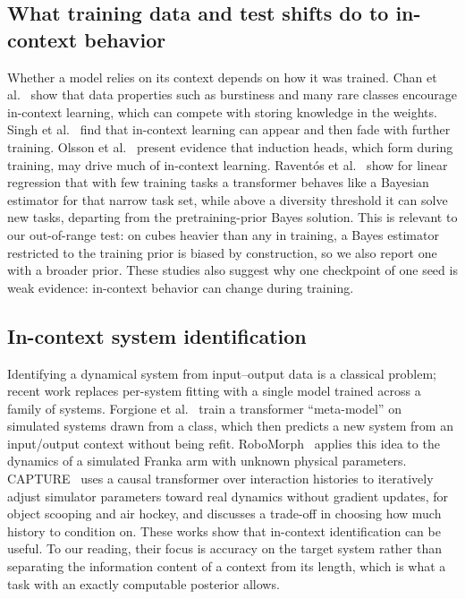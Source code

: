 \documentclass{article}
\begin{document}
\subsection{What training data and test shifts do to in-context behavior}
Whether a model relies on its context depends on how it was trained. Chan et al.~\cite{chan2022} show that data properties such as burstiness and many rare classes encourage in-context learning, which can compete with storing knowledge in the weights. Singh et al.~\cite{singh2023} find that in-context learning can appear and then fade with further training. Olsson et al.~\cite{olsson2022} present evidence that induction heads, which form during training, may drive much of in-context learning. Ravent\'os et al.~\cite{raventos2023} show for linear regression that with few training tasks a transformer behaves like a Bayesian estimator for that narrow task set, while above a diversity threshold it can solve new tasks, departing from the pretraining-prior Bayes solution. This is relevant to our out-of-range test: on cubes heavier than any in training, a Bayes estimator restricted to the training prior is biased by construction, so we also report one with a broader prior. These studies also suggest why one checkpoint of one seed is weak evidence: in-context behavior can change during training.

\subsection{In-context system identification}
Identifying a dynamical system from input--output data is a classical problem; recent work replaces per-system fitting with a single model trained across a family of systems. Forgione et al.~\cite{forgione2023} train a transformer ``meta-model'' on simulated systems drawn from a class, which then predicts a new system from an input/output context without being refit. RoboMorph~\cite{bazzi2024} applies this idea to the dynamics of a simulated Franka arm with unknown physical parameters. CAPTURE~\cite{zhang2024} uses a causal transformer over interaction histories to iteratively adjust simulator parameters toward real dynamics without gradient updates, for object scooping and air hockey, and discusses a trade-off in choosing how much history to condition on. These works show that in-context identification can be useful. To our reading, their focus is accuracy on the target system rather than separating the information content of a context from its length, which is what a task with an exactly computable posterior allows.
\end{document}
